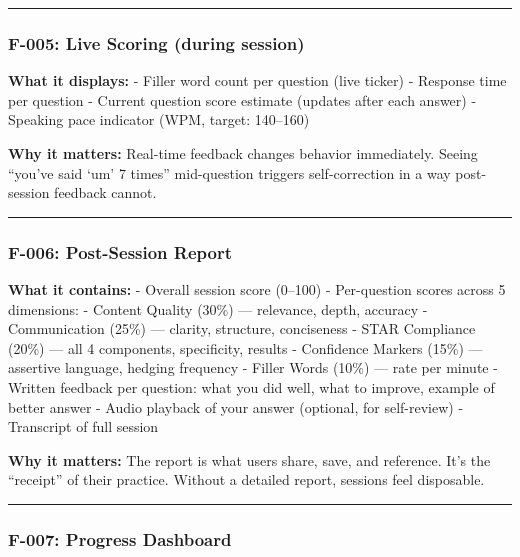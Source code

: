 \documentclass[
  11pt,
]{article}
\begin{document}
\begin{center}\rule{0.5\linewidth}{0.5pt}\end{center}

\hypertarget{f-005-live-scoring-during-session}{%
\subsubsection{F-005: Live Scoring (during
session)}\label{f-005-live-scoring-during-session}}

\textbf{What it displays:} - Filler word count per question (live
ticker) - Response time per question - Current question score estimate
(updates after each answer) - Speaking pace indicator (WPM, target:
140--160)

\textbf{Why it matters:} Real-time feedback changes behavior
immediately. Seeing ``you've said `um' 7 times'' mid-question triggers
self-correction in a way post-session feedback cannot.

\begin{center}\rule{0.5\linewidth}{0.5pt}\end{center}

\hypertarget{f-006-post-session-report}{%
\subsubsection{F-006: Post-Session
Report}\label{f-006-post-session-report}}

\textbf{What it contains:} - Overall session score (0--100) -
Per-question scores across 5 dimensions: - Content Quality (30\%) ---
relevance, depth, accuracy - Communication (25\%) --- clarity,
structure, conciseness - STAR Compliance (20\%) --- all 4 components,
specificity, results - Confidence Markers (15\%) --- assertive language,
hedging frequency - Filler Words (10\%) --- rate per minute - Written
feedback per question: what you did well, what to improve, example of
better answer - Audio playback of your answer (optional, for
self-review) - Transcript of full session

\textbf{Why it matters:} The report is what users share, save, and
reference. It's the ``receipt'' of their practice. Without a detailed
report, sessions feel disposable.

\begin{center}\rule{0.5\linewidth}{0.5pt}\end{center}

\hypertarget{f-007-progress-dashboard}{%
\subsubsection{F-007: Progress
Dashboard}\label{f-007-progress-dashboard}}
\end{document}
